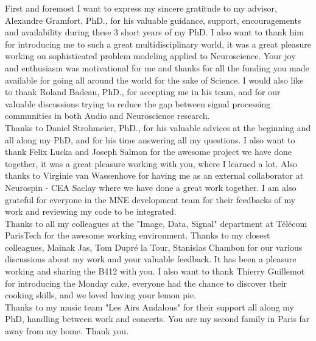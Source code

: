 
\begin{acknowledgements}
\addchaptertocentry{\acknowledgementname} %

\vspace{20pt}
First and foremost I want to express my sincere gratitude to my advisor, Alexandre Gramfort, PhD., for his valuable guidance, support, encouragements and availability during these 3 short years of my PhD. I also want to thank him for introducing me to such a great multidisciplinary world, it was a great pleasure working on sophisticated problem modeling applied to Neuroscience. Your joy and enthusiasm was motivational for me and thanks for all the funding you made available for going all around the world for the sake of Science. I would also like to thank Roland Badeau, PhD., for accepting me in his team, and for our valuable discussions trying to reduce the gap between signal processing communities in both Audio and Neuroscience research.\\

Thanks to Daniel Strohmeier, PhD., for his valuable advices at the beginning and all along my PhD, and for his time answering all my questions. I also want to thank Felix Lucka and Joseph Salmon for the awesome project we have done together, it was a great pleasure working with you, where I learned a lot. Also thanks to Virginie van Wassenhove for having me as an external collaborator at Neurospin - CEA Saclay where we have done a great work together. I am also grateful for everyone in the MNE development team for their feedbacks of my work and reviewing my code to be integrated.
\\

Thanks to all my colleagues at the "Image, Data, Signal" department at Télécom ParisTech for the awesome working environment. Thanks to my closest colleagues, Mainak Jas, Tom Dupré la Tour, Stanislas Chambon for our various discussions about my work and your valuable feedback. It has been a pleasure working and sharing the B412 with you. I also want to thank Thierry Guillemot for introducing the Monday cake, everyone had the chance to discover their cooking skills, and we loved having your lemon pie.\\

Thanks to my music team "Les Airs Andalous" for their support all along my PhD, handling between work and concerts. You are my second family in Paris far away from my home. Thank you.\\


\end{acknowledgements}

